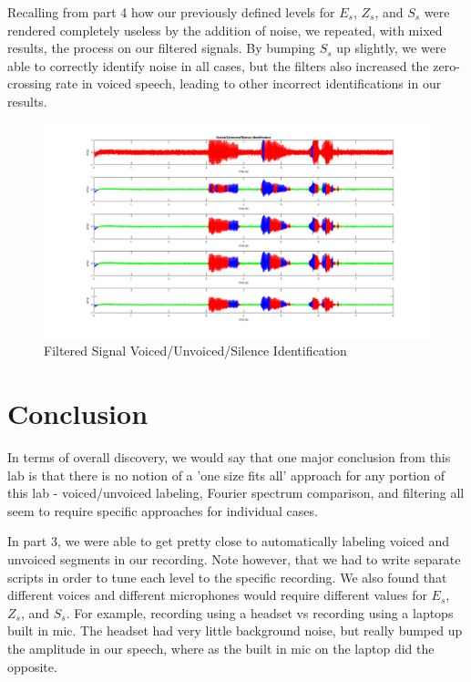 \documentclass[11pt]{article}
\begin{document}
Recalling from part 4 how our previously defined levels for $E_s$, $Z_s$, and $S_s$ were rendered completely useless by the addition of noise, we repeated, with mixed results, the process on our filtered signals. By bumping $S_s$ up slightly, we were able to correctly identify noise in all cases, but the filters also increased the zero-crossing rate in voiced speech, leading to other incorrect identifications in our results.
\begin{figure}[H]
  \centering
  \includegraphics[scale=.25]{part_9_labeling_comparison.png}
  \caption{Filtered Signal Voiced/Unvoiced/Silence Identification}
\end{figure}

%
%
%
%
%
\section{Conclusion}
In terms of overall discovery, we would say that one major conclusion from this lab is that there is no notion of a 'one size fits all' approach for any portion of this lab - voiced/unvoiced labeling, Fourier spectrum comparison, and filtering all seem to require specific approaches for individual cases.

In part 3, we were able to get pretty close to automatically labeling voiced and unvoiced segments in our recording. Note however, that we had to write separate scripts in order to tune each level to the specific recording. We also found that different voices and different microphones would require different values for $E_s$, $Z_s$, and $S_s$. For example, recording using a headset vs recording using a laptops built in mic. The headset had very little background noise, but really bumped up the amplitude in our speech, where as the built in mic on the laptop did the opposite.
\end{document}
